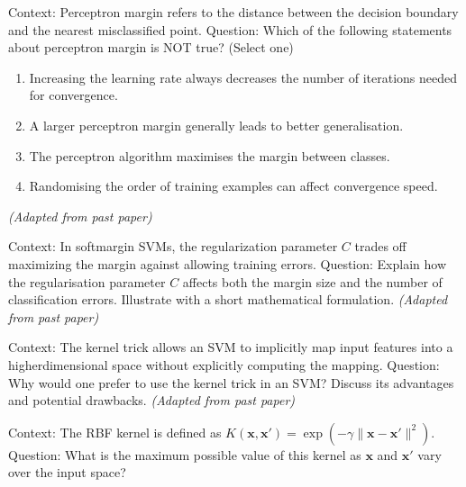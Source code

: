\documentclass[12pt, a4paper]{article}
\begin{document}
\newpage

\begin{question}
Context: Perceptron margin refers to the distance between the decision boundary and the nearest misclassified point.  
Question: Which of the following statements about perceptron margin is NOT true? (Select one)  
\begin{enumerate}
  \item Increasing the learning rate always decreases the number of iterations needed for convergence.  
  \item A larger perceptron margin generally leads to better generalisation.  
  \item The perceptron algorithm maximises the margin between classes.  
  \item Randomising the order of training examples can affect convergence speed.  
\end{enumerate}
\textit{(Adapted from past paper)}
\end{question}

\newpage

\begin{question}
Context: In softmargin SVMs, the regularization parameter \(C\) trades off maximizing the margin against allowing training errors.  
Question: Explain how the regularisation parameter \(C\) affects both the margin size and the number of classification errors.  Illustrate with a short mathematical formulation.  
\textit{(Adapted from past paper)}
\end{question}

\newpage

\begin{question}
Context: The kernel trick allows an SVM to implicitly map input features into a higherdimensional space without explicitly computing the mapping.  
Question: Why would one prefer to use the kernel trick in an SVM? Discuss its advantages and potential drawbacks.  
\textit{(Adapted from past paper)}
\end{question}

\newpage

\begin{question}
Context: The RBF kernel is defined as \(K(\mathbf x,\mathbf x')=\exp(-\gamma\|\mathbf x-\mathbf x'\|^2)\).  
Question: What is the maximum possible value of this kernel as \(\mathbf x\) and \(\mathbf x'\) vary over the input space?  
\end{question}

\newpage
\end{document}
